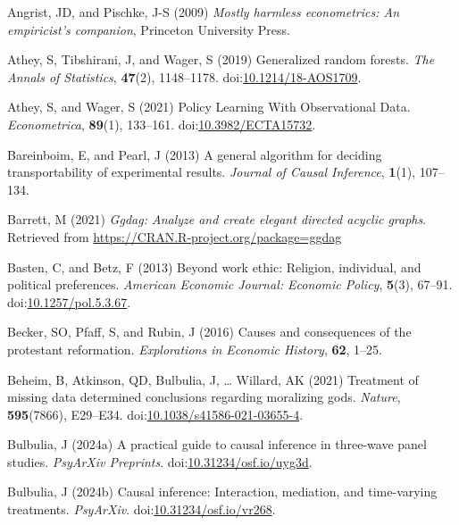 \documentclass[
  single column]{article}
\newlength{\cslhangindent}
\newenvironment{CSLReferences}[2] %
 {\begin{list}{}{%
  \setlength{\itemindent}{0pt}
  \setlength{\leftmargin}{0pt}
  \setlength{\parsep}{0pt}
  \ifodd #1
   \setlength{\leftmargin}{\cslhangindent}
   \setlength{\itemindent}{-1\cslhangindent}
  \fi
  \setlength{\itemsep}{#2\baselineskip}}}
 {\end{list}}
\begin{document}
\label{refs}
\begin{CSLReferences}{1}{0}
Angrist, JD, and Pischke, J-S (2009) \emph{Mostly harmless econometrics:
An empiricist's companion}, Princeton University Press.

Athey, S, Tibshirani, J, and Wager, S (2019) Generalized random forests.
\emph{The Annals of Statistics}, \textbf{47}(2), 1148--1178.
doi:\href{https://doi.org/10.1214/18-AOS1709}{10.1214/18-AOS1709}.

Athey, S, and Wager, S (2021) Policy Learning With Observational Data.
\emph{Econometrica}, \textbf{89}(1), 133--161.
doi:\href{https://doi.org/10.3982/ECTA15732}{10.3982/ECTA15732}.

Bareinboim, E, and Pearl, J (2013) A general algorithm for deciding
transportability of experimental results. \emph{Journal of Causal
Inference}, \textbf{1}(1), 107--134.

Barrett, M (2021) \emph{Ggdag: Analyze and create elegant directed
acyclic graphs}. Retrieved from
\url{https://CRAN.R-project.org/package=ggdag}

Basten, C, and Betz, F (2013) Beyond work ethic: Religion, individual,
and political preferences. \emph{American Economic Journal: Economic
Policy}, \textbf{5}(3), 67--91.
doi:\href{https://doi.org/10.1257/pol.5.3.67}{10.1257/pol.5.3.67}.

Becker, SO, Pfaff, S, and Rubin, J (2016) Causes and consequences of the
protestant reformation. \emph{Explorations in Economic History},
\textbf{62}, 1--25.

Beheim, B, Atkinson, QD, Bulbulia, J, \ldots{} Willard, AK (2021)
Treatment of missing data determined conclusions regarding moralizing
gods. \emph{Nature}, \textbf{595}(7866), E29--E34.
doi:\href{https://doi.org/10.1038/s41586-021-03655-4}{10.1038/s41586-021-03655-4}.

Bulbulia, J (2024a) A practical guide to causal inference in three-wave
panel studies. \emph{PsyArXiv Preprints}.
doi:\href{https://doi.org/10.31234/osf.io/uyg3d}{10.31234/osf.io/uyg3d}.

Bulbulia, J (2024b) Causal inference: Interaction, mediation, and
time-varying treatments. \emph{PsyArXiv}.
doi:\href{https://doi.org/10.31234/osf.io/vr268}{10.31234/osf.io/vr268}.


\end{CSLReferences}
\end{document}
